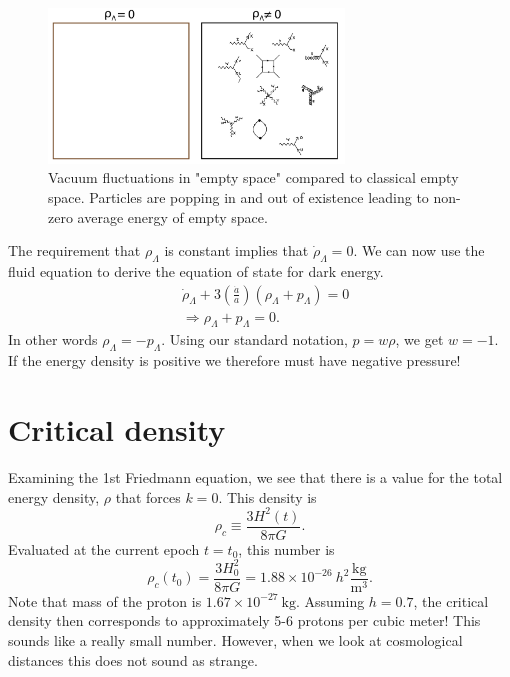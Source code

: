\documentclass[a4paper,12pt]{article}
\theoremstyle{remark}
\newcommand{\mrm}[1]{\mathrm{#1}}
\renewcommand{\=}[1]{\stackrel{#1}{=}} %
\theoremstyle{plain}
\theoremstyle{definition}
\begin{document}
\begin{figure}[t]
\begin{center}
    \includegraphics*[angle=0,width=0.7\textwidth]{img/vacuum_fluctuations.png}
    \caption[Vacuum fluctuations]{Vacuum fluctuations in "empty space" compared to classical empty space. Particles are popping in and out of existence leading to non-zero average energy of empty space.  }
\label{fig:vacuum}
\end{center}
\end{figure}

The requirement that $\rho _\Lambda$ is constant implies that $\dot{\rho} _\Lambda = 0$. We can now use the fluid equation to derive the equation of state for dark energy.
\begin{align}
&\dot{\rho} _\Lambda + 3\left(\frac{\dot{a}}{a} \right) (\rho _\Lambda + p _\Lambda) = 0 \nonumber \\
&\Rightarrow \rho _\Lambda + p _\Lambda = 0. 
\end{align}
In other words $\rho _\Lambda = - p _\Lambda$. Using our standard notation, $p = w\rho$, we get $w=-1$. If the energy density is positive we therefore must have negative pressure!

\section{Critical density}
Examining the 1st Friedmann equation, we see that there is a value for the total energy density, $\rho$ that forces $k=0$. This density is 
\begin{equation}
\rho _c \equiv \frac{3H^{2}(t)}{8\pi G}.
\end{equation}
Evaluated at the current epoch $t=t_0$, this number is 
\begin{equation}
\rho _c(t_0) = \frac{3H_0^{2}}{8\pi G} = 1.88 \times 10^{-26} \:h^{2}\mrm{\frac{kg}{m^{3}}}.
\end{equation}
Note that mass of the proton is $1.67 \times 10^{-27} \:\mrm{kg}$. Assuming $h=0.7$, the critical density then corresponds to approximately 5-6 protons per cubic meter! This sounds like a really small number. However, when we look at cosmological distances this does not sound as strange.
\end{document}
